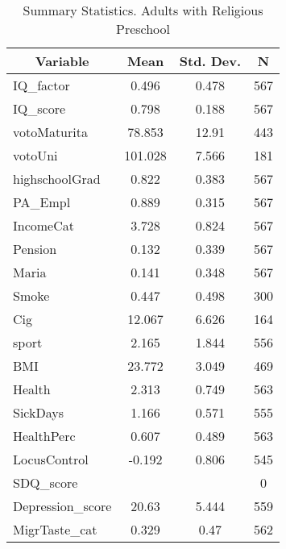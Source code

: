 
\begin{table}[htbp]\centering \caption{Summary Statistics. Adults with Religious Preschool \label{schoolAdultmaternaReli}}
\begin{tabular}{l c c  c}\hline\hline
\multicolumn{1}{c}{\textbf{Variable}} & \textbf{Mean}
 & \textbf{Std. Dev.} & \textbf{N}\\ \hline
IQ\_factor & 0.496 & 0.478  & 567\\
IQ\_score & 0.798 & 0.188  & 567\\
votoMaturita & 78.853 & 12.91  & 443\\
votoUni & 101.028 & 7.566  & 181\\
highschoolGrad & 0.822 & 0.383  & 567\\
PA\_Empl & 0.889 & 0.315  & 567\\
IncomeCat & 3.728 & 0.824  & 567\\
Pension & 0.132 & 0.339  & 567\\
Maria & 0.141 & 0.348  & 567\\
Smoke & 0.447 & 0.498  & 300\\
Cig & 12.067 & 6.626  & 164\\
sport & 2.165 & 1.844  & 556\\
BMI & 23.772 & 3.049  & 469\\
Health & 2.313 & 0.749  & 563\\
SickDays & 1.166 & 0.571  & 555\\
HealthPerc & 0.607 & 0.489  & 563\\
LocusControl & -0.192 & 0.806  & 545\\
SDQ\_score &  &   & 0\\
Depression\_score & 20.63 & 5.444  & 559\\
MigrTaste\_cat & 0.329 & 0.47  & 562\\
\hline\end{tabular}
\end{table}
